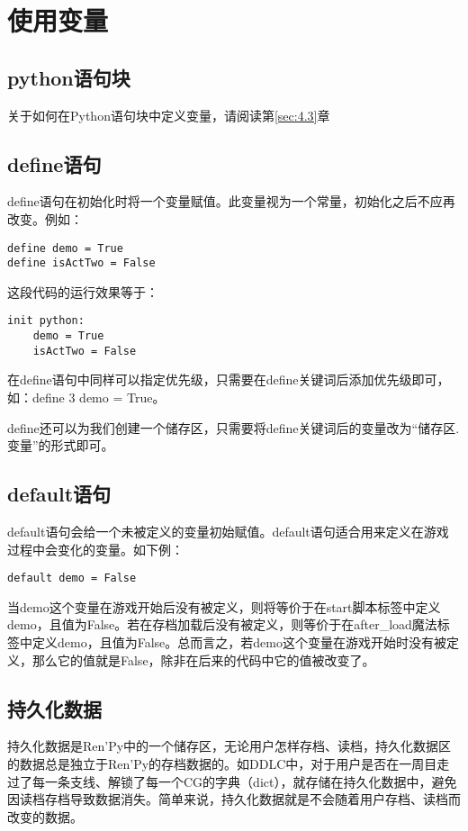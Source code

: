 \section{使用变量}
\subsection{python语句块}
关于如何在Python语句块中定义变量，请阅读第\ref{sec:4.3}章
\subsection{define语句}
define语句在初始化时将一个变量赋值。此变量视为一个常量，初始化之后不应再改变。例如：

\begin{lstlisting}
define demo = True
define isActTwo = False
\end{lstlisting}

这段代码的运行效果等于：
\begin{lstlisting}
init python:
    demo = True
    isActTwo = False
\end{lstlisting}

\begin{ExtraKnowledge}
    在define语句中同样可以指定优先级，只需要在define关键词后添加优先级即可，如：define 3 demo = True。
\end{ExtraKnowledge}

define还可以为我们创建一个储存区，只需要将define关键词后的变量改为“储存区.变量”的形式即可。

\subsection{default语句}
default语句会给一个未被定义的变量初始赋值。default语句适合用来定义在游戏过程中会变化的变量。如下例：
\begin{lstlisting}[numbers=none]
default demo = False
\end{lstlisting}

当demo这个变量在游戏开始后没有被定义，则将等价于在start脚本标签中定义demo，且值为False。若在存档加载后没有被定义，则等价于在after\_load魔法标签中定义demo，且值为False。总而言之，若demo这个变量在游戏开始时没有被定义，那么它的值就是False，除非在后来的代码中它的值被改变了。

\subsection{持久化数据}

持久化数据是Ren'Py中的一个储存区，无论用户怎样存档、读档，持久化数据区的数据总是独立于Ren'Py的存档数据的。如DDLC中，对于用户是否在一周目走过了每一条支线、解锁了每一个CG的字典（dict），就存储在持久化数据中，避免因读档存档导致数据消失。简单来说，持久化数据就是不会随着用户存档、读档而改变的数据。

